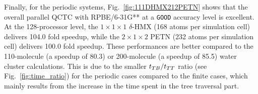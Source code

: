 \commentoutA{\documentclass[prl,aps,twocolumn,twocolumngrid,superbib]{revtex4}}
\begin{document}

Finally, for the periodic systems, Fig.~\ref{fig:111DHMX212PETN} shows
that the overall parallel QCTC with RPBE/6-31G** at a {\tt GOOD}
accuracy level is excellent. At the 128-processor level, the $1\times
1\times 1$ $\delta$-HMX (168 atoms per simulation cell) delivers 104.0
fold speedup, while the $2\times 1 \times 2$ PETN (232 atoms per
simulation cell) delivers 100.0 fold speedup. These performances are
better compared to the 110-molecule (a speedup of 80.3) or
200-molecule (a speedup of 85.5) water cluster calculations. This is
due to the smaller $t_{TB}/t_{TT}$ ratio (see Fig.~\ref{fig:time_ratio})
for the periodic cases compared to the finite cases, which mainly
results from the increase in the time spent in the tree traversal part.
\end{document}
